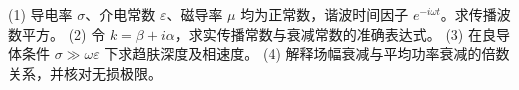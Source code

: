 (1) 导电率 \(\sigma\)、介电常数 \(\varepsilon\)、磁导率 \(\mu\) 均为正常数，谐波时间因子 \(e^{-i\omega t}\)。求传播波数平方。
(2) 令 \(k=\beta+i\alpha\)，求实传播常数与衰减常数的准确表达式。
(3) 在良导体条件 \(\sigma\gg\omega\varepsilon\) 下求趋肤深度及相速度。
(4) 解释场幅衰减与平均功率衰减的倍数关系，并核对无损极限。
